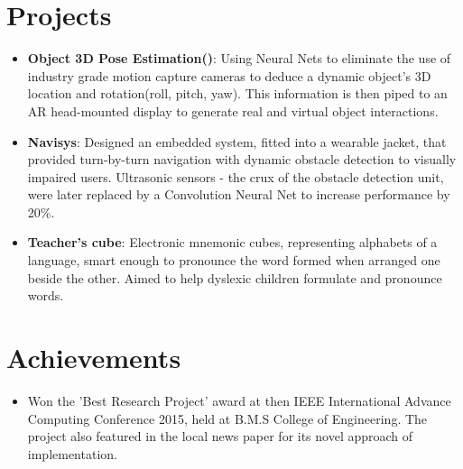 \documentclass[letterpaper,11pt]{article}
\newcommand{\resumeItem}[2]{
  \item\small{
    \textbf{#1}{: #2 \vspace{-2pt}}
  }
}
\newcommand{\resumePoint}[1]{
  \item\small{#1}
}
\newcommand{\resumeSubItem}[2]{\resumeItem{#1}{#2}\vspace{-4pt}}
\newcommand{\resumeSubHeadingListStart}{\begin{itemize}[leftmargin=*]}
\newcommand{\resumeSubHeadingListEnd}{\end{itemize}\vspace{-10pt}}
\begin{document}
\section{Projects}
  \resumeSubHeadingListStart
    \resumeSubItem{Object 3D Pose Estimation()}
      {Using Neural Nets to eliminate the use of industry grade motion capture cameras to deduce a dynamic object\rq s 3D location and rotation(roll, pitch, yaw). This information is then piped to an AR head-mounted display to generate real and virtual object interactions.}
    \resumeSubItem{Navisys}
      {Designed an embedded system, fitted into a wearable jacket, that provided turn-by-turn navigation with dynamic obstacle detection to visually impaired users. Ultrasonic sensors - the crux of the obstacle detection unit, were later replaced by a Convolution Neural Net to increase performance by 20\%.}
    \resumeSubItem{Teacher\rq s cube}
      {Electronic mnemonic cubes, representing alphabets of a language, smart enough to pronounce the word formed when arranged one beside the other. Aimed to help dyslexic children formulate and pronounce words.}
    \resumeSubHeadingListEnd

\section{Achievements}
  \resumeSubHeadingListStart
    \resumePoint{Won the 'Best Research Project' award at then IEEE International Advance Computing Conference 2015, held at B.M.S College of Engineering. The project also featured in the local news paper for its novel approach of implementation.}
  \resumeSubHeadingListEnd
\end{document}
